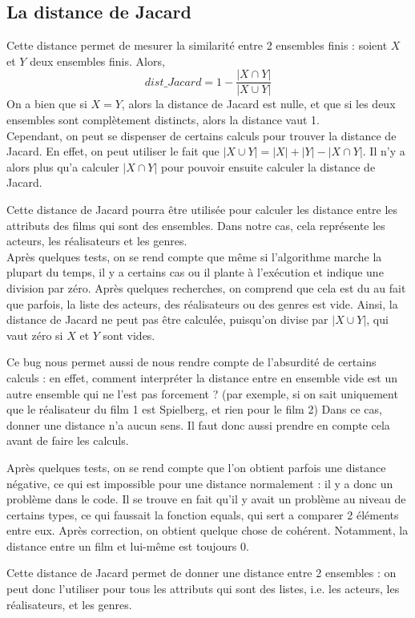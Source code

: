 \documentclass{report}
\begin{document}
\subsection{La distance de Jacard}
Cette distance permet de mesurer la similarité entre 2 ensembles finis : soient $X$ et $Y$ deux ensembles finis. Alors,
\[dist\_Jacard=1-\frac{|X \cap Y|}{|X \cup Y|}\]
On a bien que si \(X=Y\), alors la distance de Jacard est nulle, et que si les deux ensembles sont complètement distincts, alors la distance vaut 1.\\
Cependant, on peut se dispenser de certains calculs pour trouver la distance de Jacard. En effet, on peut utiliser le fait que \(|X \cup Y|=|X|+|Y|-|X \cap Y|\). Il n'y a alors plus qu'a calculer \(|X \cap Y|\) pour pouvoir ensuite calculer la distance de Jacard.\par
Cette distance de Jacard pourra être utilisée pour calculer les distance entre les attributs des films qui sont des ensembles. Dans notre cas, cela représente les acteurs, les réalisateurs et les genres.\\
Après quelques tests, on se rend compte que même si l'algorithme marche la plupart du temps, il y a certains cas ou il plante à l'exécution et indique une division par zéro. Après quelques recherches, on comprend que cela est du au fait que parfois, la liste des acteurs, des réalisateurs ou des genres est vide. Ainsi, la distance de Jacard ne peut pas être calculée, puisqu'on divise par \(|X \cup Y|\), qui vaut zéro si $X$ et $Y$ sont vides.\par
Ce bug nous permet aussi de nous rendre compte de l'absurdité de certains calculs : en effet, comment interpréter la distance entre en ensemble vide est un autre ensemble qui ne l'est pas forcement ? (par exemple, si on sait uniquement que le réalisateur du film 1 est Spielberg, et rien pour le film 2) Dans ce cas, donner une distance n'a aucun sens. Il faut donc aussi prendre en compte cela avant de faire les calculs.\par
Après quelques tests, on se rend compte que l'on obtient parfois une distance négative, ce qui est impossible pour une distance normalement : il y a donc un problème dans le code. Il se trouve en fait qu'il y avait un problème au niveau de certains types, ce qui faussait la fonction equals, qui sert a comparer 2 éléments entre eux. Après correction, on obtient quelque chose de cohérent. Notamment, la distance entre un film et lui-même est toujours 0.\par
Cette distance de Jacard permet de donner une distance entre 2 ensembles : on peut donc l'utiliser pour tous les attributs qui sont des listes, i.e. les acteurs, les réalisateurs, et les genres.
\end{document}
